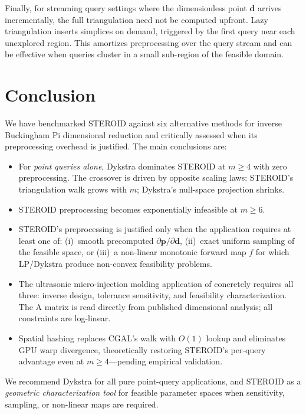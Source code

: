 \documentclass[review,onefignum,onetabnum]{./SIAM_template/siamart171218}
\begin{document}
Finally, for streaming query settings where the dimensionless point $\mathbf{d}$ arrives
incrementally, the full triangulation need not be computed upfront.  Lazy triangulation
inserts simplices on demand, triggered by the first query near each unexplored region.
This amortizes preprocessing over the query stream and can be effective when queries
cluster in a small sub-region of the feasible domain.

\section{Conclusion}
\label{sec:conclusion}

We have benchmarked STEROID against six alternative methods for inverse Buckingham Pi
dimensional reduction and critically assessed when its preprocessing overhead is
justified.  The main conclusions are:
\begin{itemize}
	\item For \emph{point queries alone}, Dykstra dominates STEROID at $m \geq 4$
	      with zero preprocessing.  The crossover is driven by opposite scaling laws:
	      STEROID's triangulation walk grows with $m$; Dykstra's null-space projection shrinks.
	\item STEROID preprocessing becomes exponentially infeasible at $m \geq 6$.
	\item STEROID's preprocessing is justified only when the application requires at
	      least one of: (i)~smooth precomputed $\partial\mathbf{p}/\partial\mathbf{d}$,
	      (ii)~exact uniform sampling of the feasible space, or (iii)~a non-linear monotonic
	      forward map $f$ for which LP/Dykstra produce non-convex feasibility problems.
	\item The ultrasonic micro-injection molding application of \cite{SalazarMeza2023}
	      concretely requires all three: inverse design, tolerance sensitivity, and feasibility
	      characterization.  The A matrix is read directly from published dimensional analysis;
	      all constraints are log-linear.
	\item Spatial hashing replaces CGAL's walk with $O(1)$ lookup and eliminates GPU
	      warp divergence, theoretically restoring STEROID's per-query advantage even at
	      $m \geq 4$---pending empirical validation.
\end{itemize}

We recommend Dykstra for all pure point-query applications, and STEROID as a
\emph{geometric characterization tool} for feasible parameter spaces when sensitivity,
sampling, or non-linear maps are required.
\end{document}
